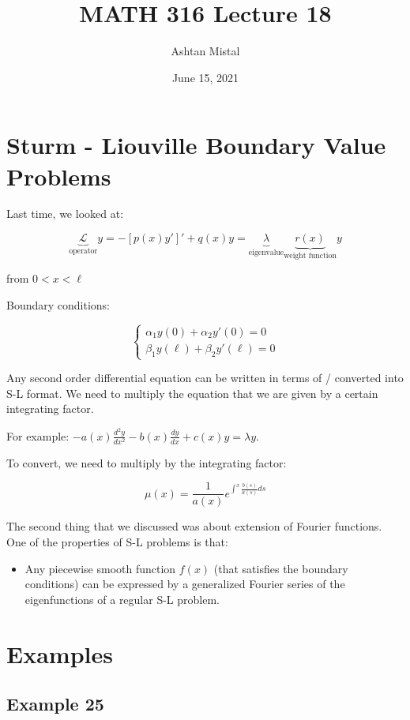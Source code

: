 \documentclass{article}
\title{MATH 316 Lecture 18}
\author{Ashtan Mistal}
\date{June 15, 2021}
\begin{document}
\ifstandalone
\maketitle
\fi

\graphicspath{{./Lecture18/}}


\section{Sturm - Liouville Boundary Value Problems}

Last time, we looked at:

$$\underbrace{\mathcal{L}}_{\text{operator}} y = - [p(x) y']' + q(x) y = \underbrace{\lambda}_{\text{eigenvalue}} \underbrace{r(x)}_{\text{weight function}} y$$

from $0 < x < \ell$

Boundary conditions:

$$\left\{ \begin{matrix} \alpha_1 y(0) + \alpha_2 y'(0) = 0 \\ \beta_1 y(\ell) + \beta_2 y'(\ell) = 0 \end{matrix} \right.$$

Any second order differential equation can be written in terms of  / converted into S-L format. We need to multiply the equation that we are given by a certain integrating factor. 

For example: $- a(x) \frac{d^2 y}{dx^2} - b(x) \frac{dy}{dx} + c(x) y = \lambda y$. 

To convert, we need to multiply by the integrating factor:

$$\mu(x) = \frac{1}{a(x)} e^{\int^x \frac{b(s)}{a(s)} ds}$$

The second thing that we discussed was about extension of Fourier functions. One of the properties of S-L problems is that:

\begin{itemize}
    \item Any piecewise smooth function $f(x)$ (that satisfies the boundary conditions) can be expressed by a generalized Fourier series of the eigenfunctions of a regular S-L problem. 
\end{itemize}

\section{Examples}

\subsection{Example 25}
\end{document}
